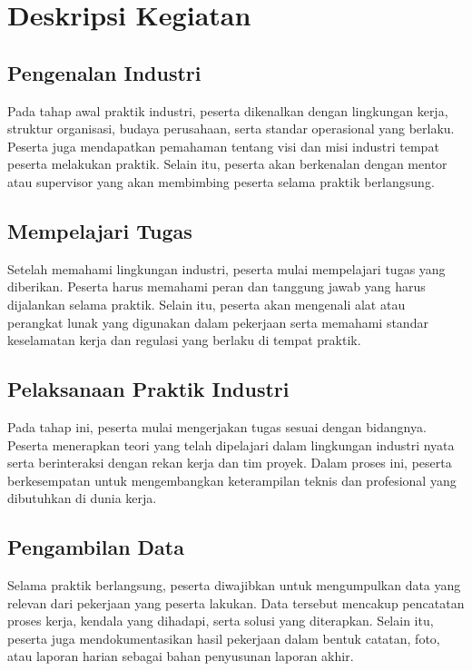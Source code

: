 \section{Deskripsi Kegiatan}

\subsection{Pengenalan Industri}
Pada tahap awal praktik industri, peserta dikenalkan dengan lingkungan kerja, struktur organisasi, budaya perusahaan, serta standar operasional yang berlaku. Peserta juga mendapatkan pemahaman tentang visi dan misi industri tempat peserta melakukan praktik. Selain itu, peserta akan berkenalan dengan mentor atau supervisor yang akan membimbing peserta selama praktik berlangsung.

\subsection{Mempelajari Tugas}
Setelah memahami lingkungan industri, peserta mulai mempelajari tugas yang diberikan. Peserta harus memahami peran dan tanggung jawab yang harus dijalankan selama praktik. Selain itu, peserta akan mengenali alat atau perangkat lunak yang digunakan dalam pekerjaan serta memahami standar keselamatan kerja dan regulasi yang berlaku di tempat praktik.

\subsection{Pelaksanaan Praktik Industri}
Pada tahap ini, peserta mulai mengerjakan tugas sesuai dengan bidangnya. Peserta menerapkan teori yang telah dipelajari dalam lingkungan industri nyata serta berinteraksi dengan rekan kerja dan tim proyek. Dalam proses ini, peserta berkesempatan untuk mengembangkan keterampilan teknis dan profesional yang dibutuhkan di dunia kerja.

\subsection{Pengambilan Data}
Selama praktik berlangsung, peserta diwajibkan untuk mengumpulkan data yang relevan dari pekerjaan yang peserta lakukan. Data tersebut mencakup pencatatan proses kerja, kendala yang dihadapi, serta solusi yang diterapkan. Selain itu, peserta juga mendokumentasikan hasil pekerjaan dalam bentuk catatan, foto, atau laporan harian sebagai bahan penyusunan laporan akhir.


